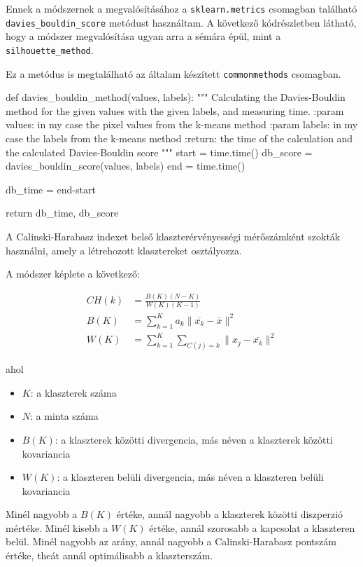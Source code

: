 Ennek a módszernek a megvalósításához a \texttt{sklearn.metrics} csomagban található \texttt{davies\_bouldin\_score} metódust használtam. A következő kódrészletben látható, hogy a módszer megvalósítása ugyan arra a sémára épül, mint a \texttt{silhouette\_method}.

Ez a metódus is megtalálható az általam készített \texttt{commonmethods} csomagban.
\begin{python}
def davies_bouldin_method(values, labels):
    """
    Calculating the Davies-Bouldin method for the given values with
    the given labels, and measuring time.
    :param values: in my case the pixel values from the k-means method
    :param labels: in my case the labels from the k-means method
    :return: the time of the calculation and
        the calculated Davies-Bouldin score
    """
    start = time.time()
    db_score = davies_bouldin_score(values, labels)
    end = time.time()

    db_time = end-start

    return db_time, db_score
\end{python}


A Calinski-Harabasz indexet belső klaszterérvényességi mérőszámként szokták használni, amely a létrehozott klasztereket osztályozza.

A módszer képlete a következő:

\begin{align*}
 CH(k) & =\frac{B(K)(N-K)}{W(K)(K-1)} \\
 B(K) & =\sum_{k=1}^{K}a_k \|\overline{x_k}-\overline{x}\|^2 \\
 W(K) & =\sum_{k=1}^{K}\sum_{C(j)=k}\|x_j-\overline{x_k}\|^2
\end{align*}

\noindent ahol
\begin{itemize}
\item $K$: a klaszterek száma
\item $N$: a minta száma
\item $B(K)$: a klaszterek közötti divergencia, más néven a klaszterek közötti kovariancia
\item $W(K)$: a klaszteren belüli divergencia, más néven a klaszteren belüli kovariancia
\end{itemize}

Minél nagyobb a $B(K)$ értéke, annál nagyobb a klaszterek közötti diszperzió mértéke. Minél kisebb a $W(K)$ értéke, annál szorosabb a kapcsolat a klaszteren belül. Minél nagyobb az arány, annál nagyobb a Calinski-Harabasz pontszám értéke, theát annál optimálisabb a klaszterszám. \cite{silhouette_calinski}


